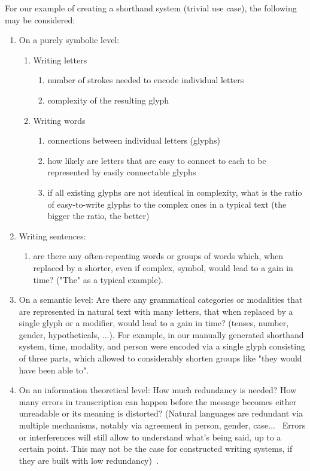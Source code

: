 \documentclass[conference]{IEEEtran}
\begin{document}
For our example of creating a shorthand system (trivial use case), the following may be considered:
\begin{enumerate}
        \item On a purely symbolic level:
        \begin{enumerate}
                \item Writing letters
                \begin{enumerate}
                        \item number of strokes needed to encode individual letters
                        \item complexity of the resulting glyph
                \end{enumerate}
                \item Writing words
                \begin{enumerate}
                        \item connections between individual letters (glyphs)
                        \item how likely are letters that are easy to connect to each to be represented by easily connectable glyphs
                        \item if all existing glyphs are not identical in complexity, what is the ratio of easy-to-write glyphs to the complex ones in a typical text (the bigger the ratio, the better)
                \end{enumerate}
        \end{enumerate}
        \item Writing sentences:
        \begin{enumerate}
                \item are there any often-repeating words or groups of words which, when replaced by a shorter, even if complex, symbol, would lead to a gain in time? ("The" as a typical example).
        \end{enumerate}
        \item On a semantic level: Are there any grammatical categories or modalities that are represented in natural text with many letters, that when replaced by a single glyph or a modifier, would lead to a gain in time? (tenses, number, gender, hypotheticals, ...). For example, in our manually generated shorthand system, time, modality, and person were encoded via a single glyph consisting of three parts, which allowed to considerably shorten groups like "they would have been able to".
        \item On an information theoretical level: How much redundancy is needed? How many errors in transcription can happen before the message becomes either unreadable or its meaning is distorted?  (Natural languages  are redundant via multiple mechanisms, notably via agreement in person, gender, case...~\citep{bussmann2006routledge} Errors or interferences will still allow to understand what’s being said, up to a certain point. This may not be the case for constructed writing systems, if they are built with low redundancy)~\citep{reza1961introduction}.
\end{enumerate}
\end{document}
